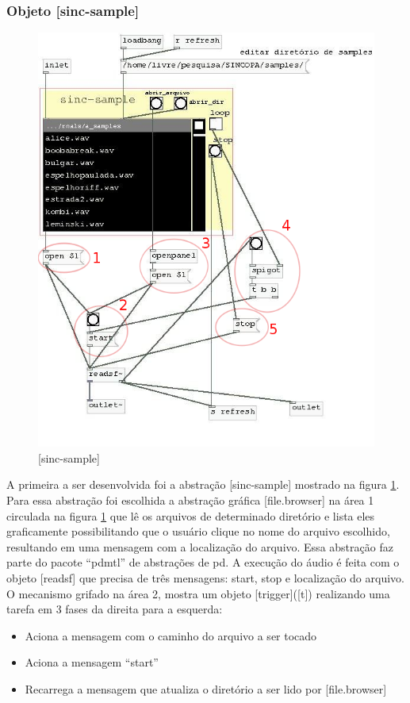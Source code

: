 \documentclass{ppgmus}
\begin{document}
\subsubsection{Objeto [sinc-sample]}



\begin{figure}
\includegraphics[scale=.5]{sinc-sample}
\caption{[sinc-sample]}
\label{[sinc-sample]}
\end{figure}



A primeira a ser desenvolvida foi a abstração [sinc-sample] mostrado na figura
\ref{[sinc-sample]}. Para essa abstração foi escolhida a abstração gráfica 
[file.browser] 
na área 1 circulada na figura \ref{[sinc-sample]} que lê os arquivos de determinado
 diretório e lista eles graficamente possibilitando que
o usuário clique no nome do arquivo escolhido, resultando em uma mensagem com a 
localização
do arquivo. Essa abstração faz parte do pacote ``pdmtl'' de abstrações de pd.
A execução do áudio é feita com o objeto [readsf\texttildelow] que precisa de três mensagens:
start, stop e localização do arquivo. O mecanismo grifado na área 2, mostra
um objeto [trigger]([t]) realizando uma tarefa em 3 fases da direita para a esquerda:
\begin{itemize}
 \item Aciona a mensagem com o caminho do arquivo a ser tocado
 \item Aciona a mensagem ``start''
 \item Recarrega a mensagem que atualiza o diretório a ser lido por [file.browser]
\end{itemize}
\end{document}
